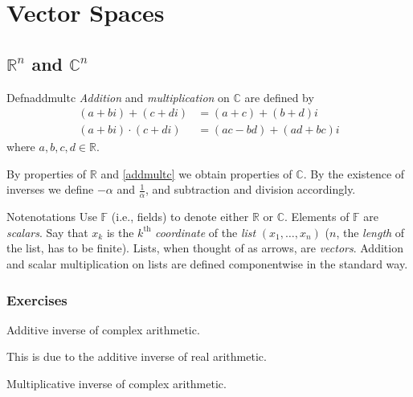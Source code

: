 \chapter{Vector Spaces}

\section{\texorpdfstring{$\mathbb R^n$ and $\mathbb C^n$}{Rn and Cn}}

\begin{reference}{Defn}{addmultc}
  \textit{Addition} and \textit{multiplication} on $\mathbb C$ are defined by
  \begin{align*}
    (a+bi)+(c+di)     & =(a+c)+(b+d)i     \\
    (a+bi)\cdot(c+di) & =(ac-bd)+(ad+bc)i
  \end{align*}
  where $a,b,c,d\in \mathbb R$.
\end{reference}

By properties of $\mathbb R$ and \ref{addmultc} we obtain properties of $\mathbb C$. By the existence of inverses we define $-\alpha$ and $\displaystyle\frac{1}{\alpha}$, and subtraction and division accordingly.

\begin{reference}{Note}{notations}
  Use $\mathbb F$ (i.e., fields) to denote either $\mathbb R$ or $\mathbb C$. Elements of $\mathbb F$ are \textit{scalars}. Say that $x_k$ is the $k^{\mathrm{th}}$ \textit{coordinate} of the \textit{list} $(x_1,\dots,x_n)$ ($n$, the \textit{length} of the list, has to be finite). Lists, when thought of as arrows, are \textit{vectors}. Addition and scalar multiplication on lists are defined componentwise in the standard way.
\end{reference}

\subsection*{Exercises}

\setcounter{exercise}{4}

\begin{exercise}
  Additive inverse of complex arithmetic.
\end{exercise}

This is due to the additive inverse of real arithmetic.

\begin{exercise}
  Multiplicative inverse of complex arithmetic.
\end{exercise}

